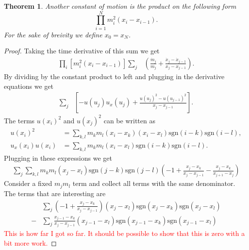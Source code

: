 \documentclass[english,master]{liumaiex}
\theoremstyle{plain}
\newtheorem{theorem}[proposition]{Theorem}
\theoremstyle{definition}
\newcommand\todo[1]{\textcolor{red}{#1}}
\newcommand{\sgn}{\text{sgn}}
\begin{document}
\begin{theorem}
	Another constant of motion is the product on the following form	
	\begin{equation}
		\prod_{i=1}^{N} m_i^2 (x_i - x_{i-1}).
	\end{equation}
	For the sake of breivity we define $x_0 = x_N$.
\end{theorem}
\begin{proof}
	Taking the time derivative of this sum we get
	\begin{equation}
	\begin{aligned}
		\prod_i [m_i^2 (x_i - x_{i-1})]
		\sum_j & (\frac{\dot{m}_j}{m_j} + \frac{\dot{x}_j - \dot{x}_{j-1}}{x_j - x_{j-1}}).
	\end{aligned}
	\end{equation}
	By dividing by the constant product to left and plugging in the derivative equations we get
	\begin{equation}
	\begin{aligned}
		\sum_j & [-u(u_j)u_x(u_j) + \frac{u(u_j)^2 - u(u_{j-1})^2}{x_j - x_{j-1}}].
	\end{aligned}
	\end{equation}
	The terms $u(x_i)^2$ and $u(x_j)^2$ can be written as
	\begin{align}
		u(x_i)^2 &= \sum_{k,l} m_k m_l (x_i - x_k) (x_i - x_l) \sgn(i - k) \sgn(i - l), \\
		u_x(x_i) u(x_i) &= \sum_{k,l} m_k m_l (x_i - x_l) \sgn(i - k) \sgn(i - l).
	\end{align}
	Plugging in these expressions we get
	\begin{equation}
	\begin{aligned}
		\sum_{j} \sum_{k,l} m_k m_l (x_j - x_l) \sgn(j - k) \sgn(j - l)
		(-1 + \frac{x_j - x_k}{x_j - x_{j-1}} - \frac{x_j - x_k}{x_{j+1} - x_j})
	\end{aligned}
	\end{equation}
	Consider a fixed $m_jm_l$ term and collect all terms with the same denominator. The terms that are interesting are
	\begin{equation}
	\begin{aligned}
		&\sum_{j} (-1 + \frac{x_j - x_k}{x_j - x_{j-1}}) (x_j - x_l) \sgn(x_j - x_k) \sgn(x_j - x_l)\\
		-&\sum_{j} \frac{x_{j-1} - x_k}{x_j - x_{j-1}} (x_{j-1} - x_l) \sgn(x_{j-1} - x_k) \sgn(x_{j-1} - x_l) 
	\end{aligned}
	\end{equation}
	\todo{This is how far I got so far. It should be possible to show that this is zero with a bit more work.}
\end{proof}
\end{document}
